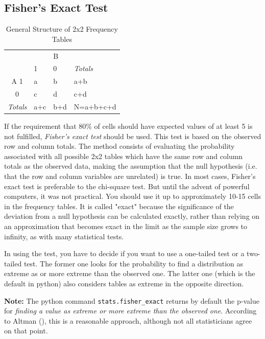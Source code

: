 \subsection{Fisher's Exact Test} 

\begin{table}
  \centering
  \begin{tabular}{|c|l l| l|}
  \hline
  &  & B &  \\
  & 1 & 0 & \emph{Totals} \\
  \hline
  A 1 & a & b & a+b \\
    0 & c & d & c+d \\
  \hline
  \emph{Totals} & a+c & b+d & N=a+b+c+d \\
  \hline
  \end{tabular}

  \caption{General Structure of 2x2 Frequency Tables}\label{table:frequencyGeneral}
\end{table}


If the requirement that 80\% of cells should have expected values of at least 5 is not fulfilled, \emph{Fisher's exact test} should be used. This test is based on the observed row and column totals. The method consists of evaluating the probability associated with all possible 2x2 tables which have the same row and column totals as the observed data, making the assumption that the null hypothesis (i.e. that the row and column variables are unrelated) is true.  In most cases, Fisher's exact test is preferable to the chi-square test. But until the advent of powerful computers, it was not practical. You should use it up to approximately 10-15 cells in the frequency tables. It is called "exact" because the significance of the deviation from a null hypothesis can be calculated exactly, rather than relying on an approximation that becomes exact in the limit as the sample size grows to infinity, as with many statistical tests.


In using the test, you have to decide if you want to use a one-tailed test or a two-tailed test. The former one looks for the probability to find a distribution as extreme as or more extreme than the observed one. The latter one (which is the default in python) also considers tables as extreme in the opposite direction.

\textbf{Note:} The python command \lstinline{stats.fisher_exact} returns by default the p-value for \emph{finding a value as extreme or more extreme than the observed one}. According to Altman (\cite{altman99}), this is a reasonable approach, although not all statisticians agree on that point.

